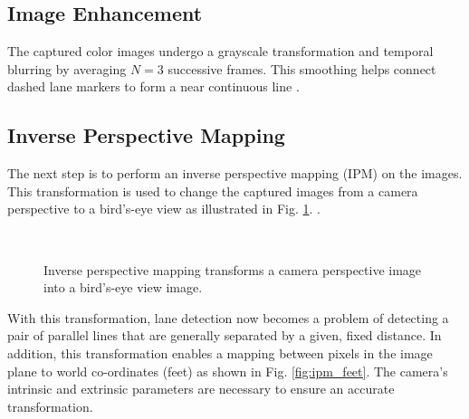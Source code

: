 \documentclass{article}
\begin{document}
\subsection{Image Enhancement}
The captured color images undergo a grayscale transformation and temporal blurring by averaging $N=3$ successive frames.  This smoothing helps connect dashed lane markers to form a near continuous line \cite{borkar_layered_2009}.
\subsection{Inverse Perspective Mapping}
The next step is to perform an inverse perspective mapping (IPM) on the images.  This transformation is used to change the captured images from a camera perspective to a bird's-eye view as illustrated in Fig. \ref{fig:ipm}.
\cite{sehestedt_robust_2007,shu_vision_2004,bertozzi_gold:parallel_1998}.
\begin{figure}[htb]
  \centering
    \hspace{0.00001in}
      \\
  \caption{Inverse perspective mapping transforms a camera perspective image into a bird's-eye view image.}
  \label{fig:ipm}
\end{figure}
With this transformation, lane detection now becomes a problem of detecting a pair of parallel lines that are generally separated by a given, fixed distance.
In addition, this transformation enables a mapping between pixels in the image plane to world co-ordinates (feet) as shown in Fig. \ref{fig:ipm_feet}. The camera's intrinsic and extrinsic parameters are necessary to ensure an accurate transformation.
\end{document}
